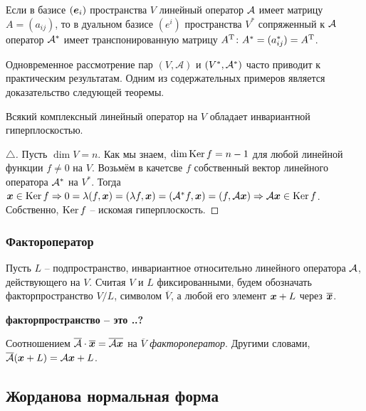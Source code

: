 \begin{to_thr} 
    Если в базисе $(\mbox{\boldmath $e$}_i)$ пространства $V$ линейный оператор $\mathcal A$ имеет матрицу $A = (a_{ij})$, то в дуальном базисе $(e^i)$ пространства $V^*$ сопряженный к $\mathcal A$ оператор $\mathcal A^*$ имеет транспонированную матрицу $A^{\text{T}} \colon A^* = (a_{ij}^*) = A^{\text{T}}$.
\end{to_thr}

Одновременное рассмотрение пар $(V, \mathcal A)$ и $(V^*, \mathcal A^*)$ часто приводит к практическим результатам. Одним из содержательных примеров является доказательство следующей теоремы.

\begin{to_thr} 
    Всякий комплексный линейный оператор на $V$ обладает инвариантной гиперплоскостью. 
\end{to_thr}

\begin{proof}[$\triangle$]
    Пусть $\dim V =n$. Как мы знаем, $\dim \mathop{\mathrm{Ker}}\nolimits f = n - 1$ для любой линейной функции $f \neq 0$ на $V$. Возьмём в качетсве $f$ собственный вектор линейного оператора $\mathcal A^*$ на $V^*$. Тогда $\mbox{\boldmath $x$} \in \mathop{\mathrm{Ker}}\nolimits f \Rightarrow 0 = \lambda(f, \mbox{\boldmath $x$}) = (\lambda f, \mbox{\boldmath $x$}) = (\mathcal A^* f, \mbox{\boldmath $x$}) = (f, \mathcal A \mbox{\boldmath $x$}) \Rightarrow \mathcal A \mbox{\boldmath $x$} \in \mathop{\mathrm{Ker}}\nolimits f$. Собственно, $\mathop{\mathrm{Ker}}\nolimits f$ -- искомая гиперплоскость.
\end{proof}


\subsubsection{Фактороператор}

Пусть $L$ -- подпространство, инвариантное относительно линейного оператора $\mathcal A$, действующего на $V$. Считая $V$ и $L$ фиксированными, будем обозначать факторпространство $V/L$, символом $\overline{V}$, а любой его элемент $\mbox{\boldmath $x$} + L$ через $\overline{\mbox{\boldmath $x$}}$.

\textbf{факторпространство -- это ..?}

\begin{to_def} 
    Соотношением $\overline{\mathcal A} \cdot \overline{\mbox{\boldmath $x$}} = \overline{\mathcal A \mbox{\boldmath $x$}}$ на $\overline{V}$ \textit{фактороператор}. Другими словами, $\overline{\mathcal A} (\mbox{\boldmath $x$} + L) = \mathcal A \mbox{\boldmath $x$} + L$.
\end{to_def}



\subsection{Жорданова нормальная форма}

